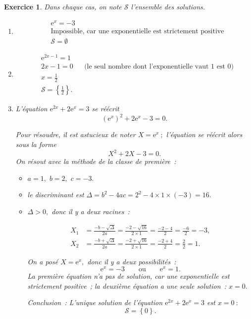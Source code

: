 \documentclass[10pt]{article}
\newtheorem{exo}{Exercice}
\begin{document}
\begin{exo}

Dans chaque cas, on note $\mathcal{S}$ l'ensemble des solutions.

\begin{enumerate}

\item \begin{align*}
&\text{e}^{x}=-3\\
&\text{Impossible, car une exponentielle est strictement positive}\\
&\mathcal{S}=\emptyset
\end{align*}

\item \begin{align*}
&\text{e}^{2x-1}=1\\
&2x-1=0&&\text{(le seul nombre dont l'exponentielle vaut 1 est 0)}\\
&x=\frac{1}{2}\\
&\mathcal{S}=\left\{\frac{1}{2}\right\}.
\end{align*}

\item L'équation $\text{e}^{2x}+2\text{e}^{x}=3$ se réécrit
\[\left(\text{e}^x\right)^2+2\text{e}^{x}-3=0.\]

Pour résoudre, il est astucieux de noter $X=\text{e}^x~;$ l'équation se réécrit alors sous la forme
\[X^2+2X-3=0.\]
On résout avec la méthode de la classe de première~:

\begin{itemize}
\item[\textbullet] $a=1,$ $b=2,$ $c=-3.$
\item[\textbullet] le discriminant est $\Delta=b^2-4ac=2^2-4\times 1\times (-3)=16.$
\item[\textbullet] $\Delta>0,$ donc il y a deux racines~:

\begin{align*}X_1&=\frac{-b-\sqrt{\Delta}}{2a}=\frac{-2-\sqrt{16}}{2\times 1}=\frac{-2-4}{2}=\frac{-6}{2}=-3,\\
X_2&=\frac{-b+\sqrt{\Delta}}{2a}=\frac{-2+\sqrt{16}}{2\times 1}=\frac{-2+4}{2}=\frac{2}{2}=1.
\end{align*}

\medskip

On a posé $X=\text{e}^x,$ donc il y a deux possibilités~:
\[\text{e}^x=-3\qquad\text{ou}\qquad \text{e}^x=1.\] La première équation n'a pas de solution, car une exponentielle est strictement positive~; la deuxième équation a une seule solution~: $x=0.$

\medskip

Conclusion~: L'unique solution de l'équation $\text{e}^{2x}+2\text{e}^{x}=3$ est $x=0~:$
\[\mathcal{S}=\left\{0\right\}.\]


\end{itemize}



\end{enumerate}
\end{exo}
\end{document}

